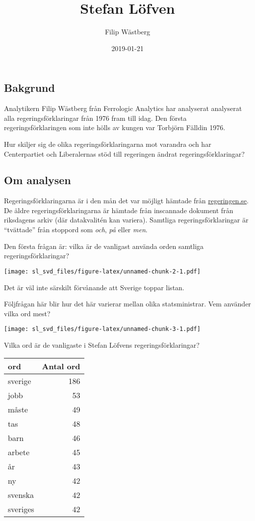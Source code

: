 \documentclass[]{article}
\title{Stefan Löfven}
\author{Filip Wästberg}
\date{2019-01-21}
\begin{document}
\maketitle

\hypertarget{bakgrund}{%
\subsection{Bakgrund}\label{bakgrund}}

Analytikern Filip Wästberg från Ferrologic Analytics har analyserat
analyserat alla regeringsförklaringar från 1976 fram till idag. Den
första regeringsförklaringen som inte hölls av kungen var Torbjörn
Fälldin 1976.

Hur skiljer sig de olika regeringsförklaringarna mot varandra och har
Centerpartiet och Liberalernas stöd till regeringen ändrat
regeringsförklaringar?

\hypertarget{om-analysen}{%
\subsection{Om analysen}\label{om-analysen}}

Regeringsförklaringarna är i den mån det var möjligt hämtade från
\href{https://www.regeringen.se/}{regeringen.se}. De äldre
regeringsförklaringarna är hämtade från inscannade dokument från
riksdagens arkiv (där datakvalitén kan variera). Samtliga
regeringsförklaringar är ``tvättade'' från stoppord som \emph{och},
\emph{på} eller \emph{men}.

Den första frågan är: vilka är de vanligast använda orden samtliga
regeringsförklaringar?

\texttt{[image: sl\_svd\_files/figure-latex/unnamed-chunk-2-1.pdf]}

Det är väl inte särskilt förvånande att Sverige toppar listan.

Följfrågan här blir hur det här varierar mellan olika statsministrar.
Vem använder vilka ord mest?

\texttt{[image: sl\_svd\_files/figure-latex/unnamed-chunk-3-1.pdf]}

Vilka ord är de vanligaste i Stefan Löfvens regeringsförklaringar?

\begin{longtable}[]{@{}lr@{}}
\toprule
ord & Antal ord\tabularnewline
\midrule
\endhead
sverige & 186\tabularnewline
jobb & 53\tabularnewline
måste & 49\tabularnewline
tas & 48\tabularnewline
barn & 46\tabularnewline
arbete & 45\tabularnewline
år & 43\tabularnewline
ny & 42\tabularnewline
svenska & 42\tabularnewline
sveriges & 42\tabularnewline
\bottomrule
\end{longtable}
\end{document}
